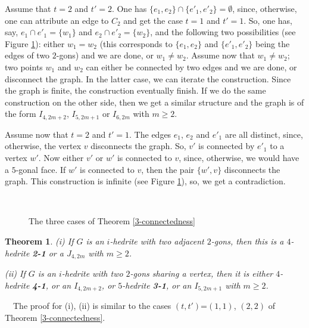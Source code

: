 \documentclass[12pt]{article}
\newtheorem{theorem}{Theorem}
\newcommand{\proof}{\noindent{\bf Proof.}\ \ }
\begin{document}
Assume that $t=2$ and $t'=2$. One has $\{e_1, e_2\}\cap \{e'_1, e'_2\}=\emptyset$, since, otherwise, one can attribute an edge to $C_2$ and get the case
$t=1$ and $t'=1$. So, one has, say, $e_1\cap e'_1=\{w_1\}$ and 
$e_2\cap e'_2=\{w_2\}$, and the following two possibilities 
(see Figure \ref{fig:TheThreeCases}): either $w_1=w_2$ (this
corresponds to $\{e_1, e_2\}$ and $\{e'_1, e'_2\}$ being the edges
of two $2$-gons) and we are done, or $w_1\not= w_2$.
Assume now that $w_1\not= w_2$; two points $w_1$ and $w_2$ can 
either be connected by two edges and we are done, or disconnect the
graph. In the latter case, we can iterate the construction. Since the 
graph is finite, the construction eventually finish. If we do the same
construction on the other side, then we get a similar structure and the 
graph is of the form $I_{4,2m+2}$, $I_{5, 2m+1}$ or $I_{6,2m}$ with 
$m\geq 2$.


Assume now that $t=2$ and $t'=1$. The edges $e_1$, $e_2$ and $e'_1$ are
all distinct, since, otherwise, the vertex $v$ disconnects the graph.
So, $v'$ is connected by $e'_1$ to a vertex $w'$. Now either $v'$ or $w'$
is connected to $v$, since, otherwise, we would have a $5$-gonal face.
If $w'$ is connected to $v$, then the pair $\{w', v\}$ disconnects the graph.
This construction is infinite (see Figure \ref{fig:TheThreeCases}), so,
we get a contradiction.




\begin{figure}
\centering
\mbox{
}
\caption{The three cases of Theorem \ref{3-connectedness}}
\label{fig:TheThreeCases}
\end{figure}



\begin{theorem}
(i) If $G$ is an $i$-hedrite with two adjacent $2$-gons, then 
this is a $4$-hedrite {\bf 2-1} or a $J_{4,2m}$ with $m\geq 2$.

(ii) If $G$ is an $i$-hedrite with two $2$-gons sharing a vertex, then 
it is either $4$-hedrite {\bf 4-1}, or an $I_{4,2m+2}$, or $5$-hedrite 
{\bf 3-1}, or an $I_{5,2m+1}$ with $m\geq 2$.

\end{theorem}

\proof The proof for (i), (ii) is similar to the cases $(t,t')$=$(1,1)$, $(2,2)$ of Theorem \ref{3-connectedness}.
\end{document}
